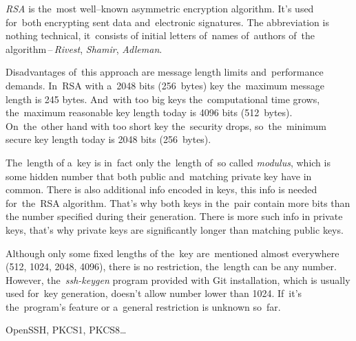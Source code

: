 \textit{RSA} is the~most well--known asymmetric encryption algorithm. It's used for~both encrypting sent data and~electronic signatures. The abbreviation is nothing technical, it~consists of initial letters of~names of~authors of~the algorithm\,--\,\textit{Rivest}, \textit{Shamir}, \textit{Adleman}.

Disadvantages of~this approach are message length limits and~performance demands. In~RSA with a~2048 bits (256~bytes) key the~maximum message length is 245 bytes. And~with too big keys the~computational time grows, the~maximum reasonable key length today is 4096 bits (512~bytes). On~the~other hand with too short key the~security drops, so~the~minimum secure key length today is 2048 bits (256~bytes).

The~length of a~key is in~fact only the~length of~so called \textit{modulus}, which is some hidden number that both public and~matching private key have in common. There is also additional info encoded in keys, this info is needed for~the~RSA algorithm. That's why both keys in the~pair contain more bits than the number specified during their generation. There is more such info in private keys, that's why private keys are significantly longer than matching public keys.

\warning Although only some fixed lengths of the~key are~mentioned almost everywhere (512, 1024, 2048, 4096), there is no restriction, the~length can be any number. However, the~\textit{ssh-keygen} program provided with Git installation, which is usually used for~key generation, doesn't allow number lower than 1024. If~it's the~program's feature or a~general restriction is unknown so~far.

\newline\todo OpenSSH, PKCS1, PKCS8\dots

\label{electronicsignature}



